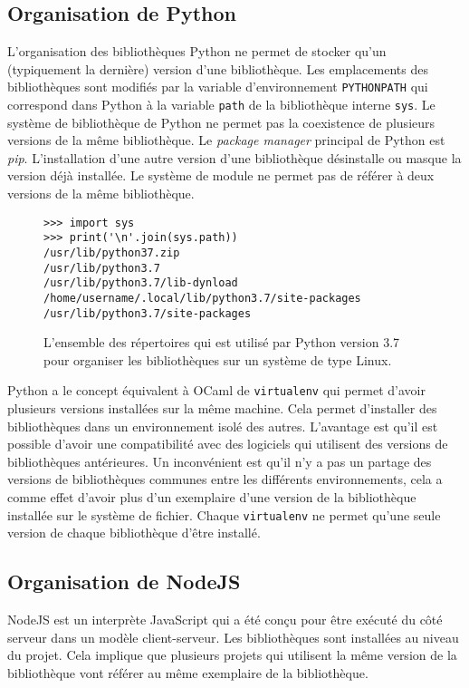 \subsection{Organisation de Python}
%
L'organisation des bibliothèques Python ne permet de stocker qu'un (typiquement la dernière)
version d'une bibliothèque. Les emplacements des bibliothèques sont modifiés
par la variable d'environnement \verb|PYTHONPATH| qui correspond dans Python à
la variable \verb|path| de la bibliothèque interne \verb|sys|. Le système de
bibliothèque de Python ne permet pas la coexistence de plusieurs versions de la
même bibliothèque. Le \textit{package manager} principal de Python est
\textit{pip}.  L'installation d'une autre version d'une bibliothèque
désinstalle ou masque la version déjà installée. Le système de module ne permet
pas de référer à deux versions de la même bibliothèque.

\begin{figure}[ht]
    \begin{minipage}[t]{0.5\textwidth}
\begin{verbatim}
>>> import sys
>>> print('\n'.join(sys.path))
/usr/lib/python37.zip
/usr/lib/python3.7
/usr/lib/python3.7/lib-dynload
/home/username/.local/lib/python3.7/site-packages
/usr/lib/python3.7/site-packages
\end{verbatim}
    \end{minipage}
    \caption{L'ensemble des répertoires qui est utilisé par Python version 3.7
    pour organiser les bibliothèques sur un système de type Linux.}
\end{figure}

Python a le concept équivalent à OCaml de \texttt{virtualenv} qui permet
d'avoir plusieurs versions installées sur la même machine. Cela permet
d'installer des bibliothèques dans un environnement isolé des autres.
L'avantage est qu'il est possible d'avoir une compatibilité avec des logiciels
qui utilisent des versions de bibliothèques antérieures. Un inconvénient est
qu'il n'y a pas un partage des versions de bibliothèques communes entre les
différents environnements, cela a comme effet d'avoir plus d'un exemplaire d'une
version de la bibliothèque installée sur le système de fichier. Chaque
\texttt{virtualenv} ne permet qu'une seule version de chaque bibliothèque
d'être installé.


\subsection{Organisation de NodeJS}
%
NodeJS est un interprète JavaScript qui a été conçu pour être exécuté du côté
serveur dans un modèle client-serveur. Les bibliothèques sont installées au
niveau du projet. Cela implique que plusieurs projets qui utilisent la même
version de la bibliothèque vont référer au même exemplaire de la
bibliothèque.

